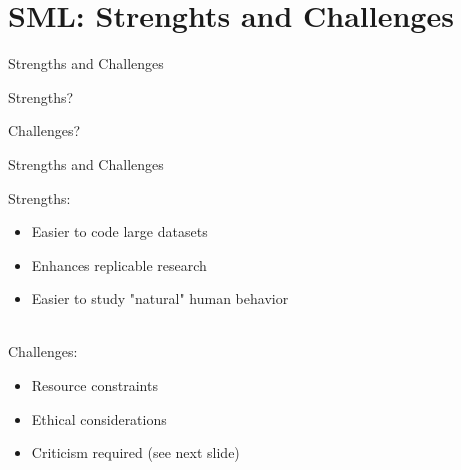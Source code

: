 \documentclass[handout]{beamer}
\begin{document}
\section{SML: Strenghts and Challenges}


\begin{frame}{Strengths and Challenges} 
	
Strengths?

	
Challenges?

\end{frame}



\begin{frame}{Strengths and Challenges} 
	
Strengths:
\begin{itemize}
	\item Easier to code large datasets
	\item Enhances replicable research
	\item Easier to study "natural" human behavior \\\
\end{itemize}
	
Challenges:
\begin{itemize}
	\item Resource constraints
	\item Ethical considerations
	\item Criticism required (see next slide)
\end{itemize}



\end{frame}
\end{document}
